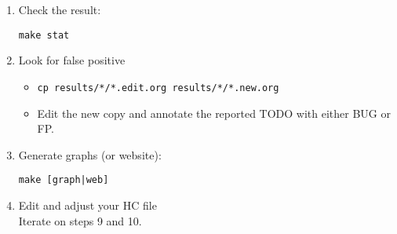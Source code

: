 \begin{enumerate}
\item Check the result:

  \texttt{make stat}

\item Look for false positive

  \begin{itemize}
  \item \texttt{cp results/*/*.edit.org results/*/*.new.org}
  \item Edit the new copy and annotate the reported TODO with either
    BUG or FP.
  \end{itemize}

\item Generate graphs (or website):

  \texttt{make [graph|web]}

\item Edit and adjust your HC file\\

  Iterate on steps 9 and 10.
\end{enumerate}

